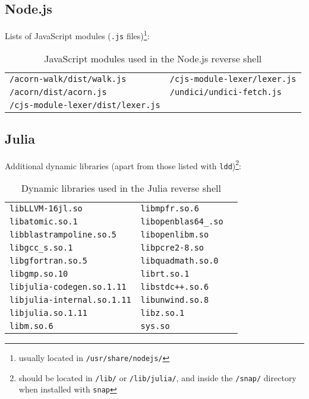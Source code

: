 \subsection*{Node.js}


Lists of JavaScript modules (\texttt{.js} files)\footnote{usually located in \texttt{/usr/share/nodejs/}}:

\begin{longtable}{l l}
\caption{JavaScript modules used in the Node.js reverse shell}\label{tab:node-dpd} \\
\texttt{/acorn-walk/dist/walk.js} & \texttt{/cjs-module-lexer/lexer.js} \\
\texttt{/acorn/dist/acorn.js} & \texttt{/undici/undici-fetch.js} \\
\texttt{/cjs-module-lexer/dist/lexer.js} & \\
\end{longtable}


\subsection*{Julia}


Additional dynamic libraries (apart from those listed with \texttt{ldd})\footnote{should be located in \texttt{/lib/} or \texttt{/lib/julia/}, and inside the \texttt{/snap/} directory when installed with \texttt{snap}}:

\begin{longtable}{l l l}
\caption{Dynamic libraries used in the Julia reverse shell}\label{tab:julia-dpd} \\
\texttt{libLLVM-16jl.so} & \texttt{libmpfr.so.6} \\
\texttt{libatomic.so.1} & \texttt{libopenblas64\_.so} \\
\texttt{libblastrampoline.so.5} & \texttt{libopenlibm.so} \\
\texttt{libgcc\_s.so.1} & \texttt{libpcre2-8.so} \\
\texttt{libgfortran.so.5} & \texttt{libquadmath.so.0} \\
\texttt{libgmp.so.10} & \texttt{librt.so.1} \\
\texttt{libjulia-codegen.so.1.11} & \texttt{libstdc++.so.6} \\
\texttt{libjulia-internal.so.1.11} & \texttt{libunwind.so.8} \\
\texttt{libjulia.so.1.11} & \texttt{libz.so.1} \\
\texttt{libm.so.6} & \texttt{sys.so} \\
\end{longtable}



